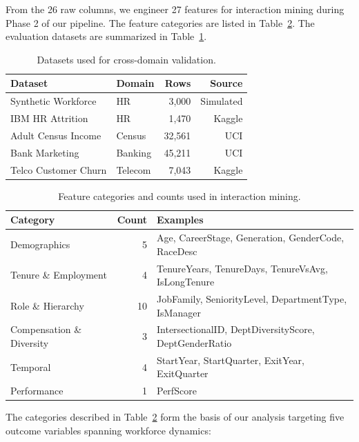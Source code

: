 \documentclass[conference]{IEEEtran}
\begin{document}
From the 26 raw columns, we engineer 27 features for interaction mining during Phase 2 of our pipeline. The feature categories are listed in Table~\ref{tab:features}. The evaluation datasets are summarized in Table~\ref{tab:datasets}.

\begin{table}[htb]
\centering
\footnotesize
\renewcommand{\arraystretch}{1.15}
\caption{Datasets used for cross-domain validation.}
\label{tab:datasets}
\begin{tabular}{llrr}
\hline
Dataset & Domain & Rows & Source \\
\hline
Synthetic Workforce & HR & 3,000 & Simulated \\
IBM HR Attrition & HR & 1,470 & Kaggle \\
Adult Census Income & Census & 32,561 & UCI \\
Bank Marketing & Banking & 45,211 & UCI \\
Telco Customer Churn & Telecom & 7,043 & Kaggle \\
\hline
\end{tabular}
\end{table}

\begin{table}[htb]
\centering
\footnotesize
\renewcommand{\arraystretch}{1.15}
\caption{Feature categories and counts used in interaction mining.}
\label{tab:features}
\begin{tabular}{lrp{2.8cm}}
\hline
Category & Count & Examples \\
\hline
Demographics & 5 & Age, CareerStage, Generation, GenderCode, RaceDesc \\
Tenure \& Employment & 4 & TenureYears, TenureDays, TenureVsAvg, IsLongTenure \\
Role \& Hierarchy & 10 & JobFamily, SeniorityLevel, DepartmentType, IsManager \\
Compensation \& Diversity & 3 & IntersectionalID, DeptDiversityScore, DeptGenderRatio \\
Temporal & 4 & StartYear, StartQuarter, ExitYear, ExitQuarter \\
Performance & 1 & PerfScore \\
\hline
\end{tabular}
\end{table}

The categories described in Table~\ref{tab:features} form the basis of our analysis targeting five outcome variables spanning workforce dynamics:
\end{document}
